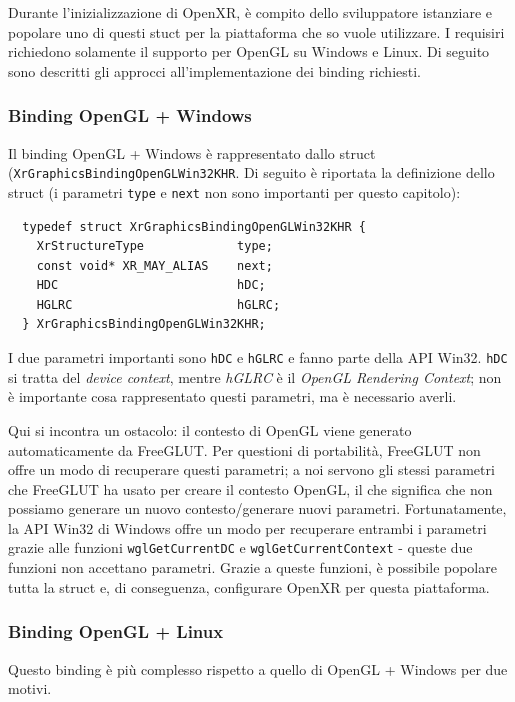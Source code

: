\documentclass[twoside]{supsistudent}
\begin{document}
Durante l'inizializzazione di OpenXR, è compito dello sviluppatore istanziare e popolare uno di questi stuct per la piattaforma che so vuole utilizzare. I requisiri richiedono solamente il supporto per OpenGL su Windows e Linux. Di seguito sono descritti gli approcci all'implementazione dei binding richiesti.

\subsubsection{Binding OpenGL + Windows}

Il binding OpenGL + Windows è rappresentato dallo struct (\texttt{XrGraphicsBindingOpenGLWin32KHR}. Di seguito è riportata la definizione dello struct (i parametri \texttt{type} e \texttt{next} non sono importanti per questo capitolo):

\begin{verbatim}
  typedef struct XrGraphicsBindingOpenGLWin32KHR {
    XrStructureType             type;
    const void* XR_MAY_ALIAS    next;
    HDC                         hDC;
    HGLRC                       hGLRC;
  } XrGraphicsBindingOpenGLWin32KHR;
\end{verbatim}

I due parametri importanti sono \texttt{hDC} e \texttt{hGLRC} e fanno parte della API Win32. \texttt{hDC} si tratta del \textit{device context}, mentre \textit{hGLRC} è il \textit{OpenGL Rendering Context}; non è importante cosa rappresentato questi parametri, ma è necessario averli.

Qui si incontra un ostacolo: il contesto di OpenGL viene generato automaticamente da FreeGLUT. Per questioni di portabilità, FreeGLUT non offre un modo di recuperare questi parametri; a noi servono gli stessi parametri che FreeGLUT ha usato per creare il contesto OpenGL, il che significa che non possiamo generare un nuovo contesto/generare nuovi parametri. Fortunatamente, la API Win32 di Windows offre un modo per recuperare entrambi i parametri grazie alle funzioni \texttt{wglGetCurrentDC} e \texttt{wglGetCurrentContext} - queste due funzioni non accettano parametri. Grazie a queste funzioni, è possibile popolare tutta la struct e, di conseguenza, configurare OpenXR per questa piattaforma.

\subsubsection{Binding OpenGL + Linux}

Questo binding è più complesso rispetto a quello di OpenGL + Windows per due motivi.
\end{document}

